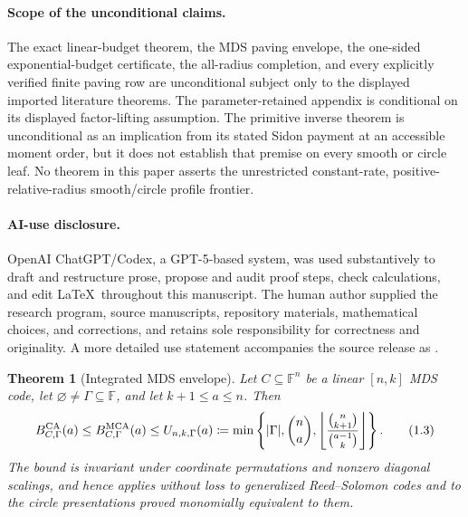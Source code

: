 \documentclass[11pt,a4paper]{amsart}
\numberwithin{equation}{section}
\newtheorem{theorem}{Theorem}[section]
\theoremstyle{remark}
\newcommand{\F}{\mathbb F}
\newcommand{\abs}[1]{\lvert #1\rvert}
\newcommand{\floor}[1]{\left\lfloor #1\right\rfloor}
\newcommand{\defeq}{\coloneqq}
\begin{document}
\paragraph{Scope of the unconditional claims.}
The exact linear-budget theorem, the MDS paving envelope, the one-sided
exponential-budget certificate, the all-radius completion, and every
explicitly verified finite paving row are unconditional subject only to the
displayed imported literature theorems.  The parameter-retained appendix is
conditional on its displayed factor-lifting assumption.  The primitive
inverse theorem is unconditional as an implication from its stated Sidon
payment at an accessible moment order, but it does not establish that
premise on every smooth or circle leaf.  No theorem in this paper asserts the unrestricted
constant-rate, positive-relative-radius smooth/circle profile frontier.

\paragraph{AI-use disclosure.}
OpenAI ChatGPT/Codex, a GPT-5-based system, was used substantively to draft
and restructure prose, propose and audit proof steps, check calculations,
and edit \LaTeX\ throughout this manuscript.  The human author supplied the
research program, source manuscripts, repository materials, mathematical
choices, and corrections, and retains sole responsibility for correctness
and originality.  A more detailed use statement accompanies the source
release as .

\begin{theorem}[Integrated MDS envelope]\label{thm:intro-paving}
Let \(C\subseteq\F^n\) be a linear \([n,k]\) MDS code,
let \(\varnothing\ne\Gamma\subseteq\F\), and let \(k+1\le a\le n\).
Then
\[
 B_{C,\Gamma}^{\rm CA}(a)\le B_{C,\Gamma}^{\rm MCA}(a)
 \le U_{n,k,\Gamma}(a)
 \defeq\min\left\{\abs\Gamma,\binom na,
 \floor{\frac{\binom n{k+1}}{\binom{a-1}k}}\right\}.       \tag{1.3}
 \label{eq:intro-paving}
\]
The bound is invariant under coordinate permutations and nonzero diagonal
scalings, and hence applies without loss to generalized Reed--Solomon codes
and to the circle presentations proved monomially equivalent to them.
\end{theorem}
\end{document}
